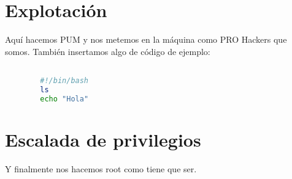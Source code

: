 \documentclass[a4paper]{article} %
\begin{document}
	\section{Explotación}
	Aquí hacemos PUM y nos metemos en la máquina como PRO Hackers que somos. También insertamos algo de código de ejemplo: 
	
	\begin{lstlisting}[language=Bash, caption=Código de ejemplo]

		#!/bin/bash
		ls
		echo "Hola"
	\end{lstlisting}
	
	
	
	\section{Escalada de privilegios}
	Y finalmente nos hacemos root como tiene que ser. 
	
	
\end{document}
